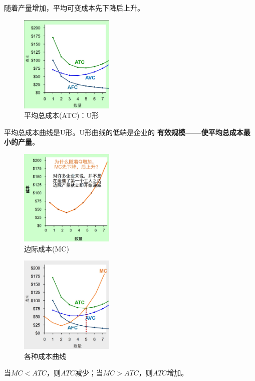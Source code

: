 \documentclass[12pt, a4paper]{article}
\begin{document}
随着产量增加，平均可变成本先下降后上升。

\begin{figure}[H]
  \centering
  \includegraphics[width=0.4\textwidth]{ATC.png}
  \caption{平均总成本(ATC)：U形}
\end{figure}

平均总成本曲线是U形。U形曲线的低端是企业的 \textbf{有效规模——使平均总成本最小的产量}。

\begin{figure}[H]
  \centering
  \includegraphics[width=0.4\textwidth]{MC.png}
  \caption{边际成本(MC)}
\end{figure}

\begin{figure}[H]
  \centering
  \includegraphics[width=0.4\textwidth]{各种成本曲线.png}
  \caption{各种成本曲线}
\end{figure}

当\( MC < ATC \)，则\( ATC \)减少；当\( MC > ATC \)，则\( ATC \)增加。
\end{document}
